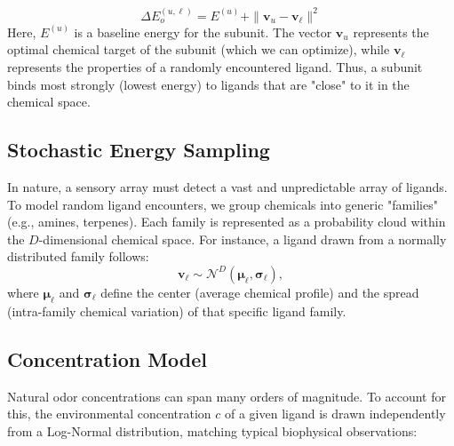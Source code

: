 \documentclass[
    reprint, %
    amsmath,
    amssymb,
    aps,
    prb,      %
    floatfix
]{revtex4-2}
\begin{document}
$$
\Delta E_o^{(u,\ell)} = E^{(u)} + \|\textbf{v}_u - \textbf{v}_\ell\|^2
$$
Here, $E^{(u)}$ is a baseline energy for the subunit. The vector $\textbf{v}_u$ represents the optimal chemical target of the subunit (which we can optimize), while $\textbf{v}_\ell$ represents the properties of a randomly encountered ligand. Thus, a subunit binds most strongly (lowest energy) to ligands that are "close" to it in the chemical space.

\subsection{Stochastic Energy Sampling}

In nature, a sensory array must detect a vast and unpredictable array of ligands. To model random ligand encounters, we group chemicals into generic "families" (e.g., amines, terpenes). Each family is represented as a probability cloud within the $D$-dimensional chemical space. For instance, a ligand drawn from a normally distributed family follows:
$$
\textbf{v}_\ell \sim \mathcal{N}^D(\boldsymbol{\mu}_\ell, \boldsymbol{\sigma}_\ell),
$$
where $\boldsymbol{\mu}_\ell$ and $\boldsymbol{\sigma}_\ell$ define the center (average chemical profile) and the spread (intra-family chemical variation) of that specific ligand family.

\subsection{Concentration Model}
Natural odor concentrations can span many orders of magnitude. To account for this, the environmental concentration $c$ of a given ligand is drawn independently from a Log-Normal distribution, matching typical biophysical observations:
\end{document}
